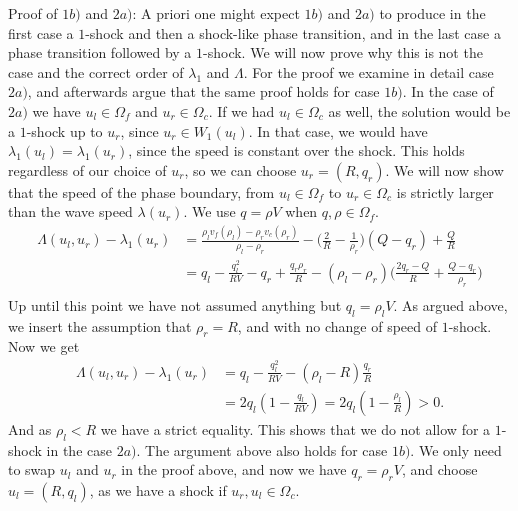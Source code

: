 \documentclass[10pt]{article}
\numberwithin{equation}{section}
\begin{document}
\begin{enumerate}
Proof of $1b)$ and $2a)$: \newline
A priori one might expect $1b)$ and $2a)$ to produce in the first case a $1$-shock and then a shock-like phase transition, and in the last case a phase transition followed by a $1$-shock. We will now prove why this is not the case and the correct order of $\lambda_1$ and $\Lambda$. 
For the proof we examine in detail case $2a)$, and afterwards argue that the same proof holds for case $1b)$. In the case of $2a)$ we have $u_l \in \Omega_f$ and $u_r \in \Omega_c$. If we had $u_l \in \Omega_c$ as well, the solution would be a $1$-shock up to $u_r$, since $u_r \in W_1(u_l)$. In that case, we would have $\lambda_1(u_l) = \lambda_1(u_r)$, since the speed is constant over the shock. This holds regardless of our choice of $u_r$, so we can choose $u_r = (R, q_r)$. We will now show that the speed of the phase boundary, from $u_l \in \Omega_f$ to $u_r \in \Omega_c$ is strictly larger than the wave speed $\lambda(u_r)$. We use $q = \rho V$ when $q, \rho \in \Omega_f$. 
\begin{align*}
    \Lambda(u_l, u_r) - \lambda_1(u_r) &= \frac{\rho_l v_f(\rho_l) - \rho_r v_c(\rho_r)}{\rho_l - \rho_r} - \bigg ( \frac{2}{R} - \frac{1}{\rho_r}\bigg) (Q-q_r) + \frac{Q}{R} \\
    &= q_l - \frac{q_l^2}{RV} - q_r + \frac{q_r \rho_r}{R} - (\rho_l - \rho_r) \bigg( \frac{2q_r - Q}{R} + \frac{Q-q_r}{\rho_r}\bigg) \\
\end{align*}
Up until this point we have not assumed anything but $q_l = \rho_l V$. As argued above, we insert the assumption that $\rho_r = R$, and with no change of speed of $1$-shock. Now we get
\begin{align*}
    \Lambda(u_l, u_r) - \lambda_1(u_r) &= q_l - \frac{q_l^2}{RV} - (\rho_l - R) \frac{q_r}{R} \\
    &= 2q_l(1- \frac{q_l}{RV}) = 2q_l(1- \frac{\rho_l}{R}) > 0.
\end{align*}
And as $\rho_l < R$ we have a strict equality. This shows that we do not allow for a $1$-shock in the case $2a)$. The argument above also holds for case $1b)$. We only need to swap $u_l$ and $u_r$ in the proof above, and now we have $q_r = \rho_r V$, and choose $u_l = (R, q_l)$, as we have a shock if $u_r, u_l \in \Omega_c $. 


\end{enumerate}
\end{document}
